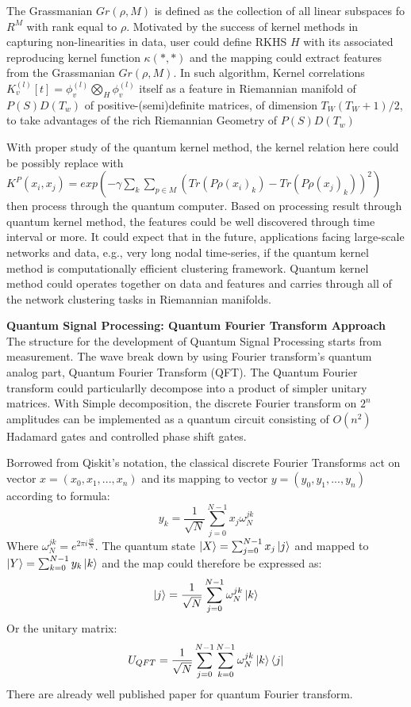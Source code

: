 \documentclass{article}
\begin{document}
The Grassmanian $Gr(\rho, M)$ is defined as the collection 
of all linear subspaces fo $R^M$ with rank equal to $\rho$. 
Motivated by the success of kernel methods in capturing 
non-linearities in data, user could define RKHS $H$ with its associated
reproducing kernel function $\kappa(*,*)$ and the mapping 
could extract features from the Grassmanian $Gr(\rho, M)$. In such 
algorithm, Kernel correlations 
$K_v^{(l)}[t] = \phi_v^{(l)} \bigotimes_H \phi_v^{(l)}$ itself 
as a feature in Riemannian manifold of $P(S)D(T_w)$ of 
positive-(semi)definite matrices, of dimension $T_W (T_W+1)/2$,
to take advantages of the rich Riemannian Geometry of $P(S)D(T_w)$

With proper study of the quantum kernel method, the kernel relation 
here could be possibly replace with $
  K^P (x_i,x_j) = exp(-\gamma \sum_k \sum_{p \in M} 
  (Tr(P \rho(x_i)_k)-Tr(P \rho(x_j)_k))^2)
$
then process through the quantum computer. Based on processing 
result through quantum kernel method, the features could be well 
discovered through time interval or more. It could expect that in 
the future, applications facing large-scale networks and data, e.g., very long 
nodal time-series, if the quantum kernel method is computationally efficient clustering 
framework.  Quantum kernel method could operates together 
on data and features 
and carries through all of the network clustering tasks in 
Riemannian manifolds. 

\textbf{Quantum Signal Processing: Quantum Fourier Transform Approach}\newline
The structure for the development of Quantum Signal Processing starts from
measurement. The wave break down by using Fourier transform's quantum analog
part, Quantum Fourier Transform (QFT). The Quantum Fourier transform could
particularlly decompose into a product of simpler unitary matrices.
With Simple decomposition, the discrete Fourier transform on $2^n$ amplitudes
can be implemented as a quantum circuit consisting of $O(n^2)$ Hadamard
gates and controlled phase shift gates.

Borrowed from Qiskit's notation, the classical discrete Fourier Transforms
act on vector $x = (x_0, x_1,...,x_n)$ and its mapping to vector $y = (y_0, y_1,...,y_n)$
according to formula:
\begin{equation}
  y_k = \frac{1}{\sqrt{N}} \sum^{N-1}_{j=0} x_j \omega_N^{jk}
\end{equation}
Where $\omega_N^{jk} = e^{2\pi i \frac{jk}{N}}$. The quantum state
$ \ket{X} = \sum^{N-1}_{j=0} x_j \ket{j} $ and mapped to $ \ket{Y} = \sum^{N-1}_{k=0} y_k \ket{k} $
and the map could therefore be expressed as:
\begin{equation}
  \ket{j}  = \frac{1}{\sqrt{N}} \sum^{N-1}_{j=0} \omega_N^{jk} \ket{k}
\end{equation}
Or the unitary matrix:
\begin{equation}
  U_{QFT}= \frac{1}{\sqrt{N}} \sum^{N-1}_{j=0} \sum^{N-1}_{k=0}  \omega_N^{jk} \ket{k} \bra{j}
\end{equation}
There are already well published paper for quantum Fourier transform.
\end{document}
